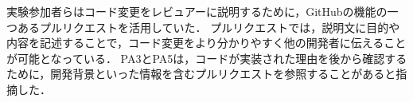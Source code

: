 実験参加者らはコード変更をレビュアーに説明するために，GitHubの機能の一つあるプルリクエストを活用していた．
プルリクエストでは，説明文に目的や内容を記述することで，コード変更をより分かりやすく他の開発者に伝えることが可能となっている．
PA3とPA5は，コードが実装された理由を後から確認するために，開発背景といった情報を含むプルリクエストを参照することがあると指摘した．









